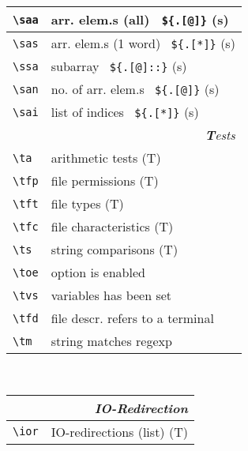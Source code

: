\documentclass[oneside,11pt,landscape,DIV16]{scrartcl}
\begin{document}
\begin{multicols}{3}
\begin{center}
\begin{tabular}[]{|p{11mm}|p{60mm}|}
\hline \verb'\saa' & arr. elem.s (all) \ \verb'${.[@]}'    \hfill (s)\\
\hline \verb'\sas' & arr. elem.s (1 word) \ \verb'${.[*]}' \hfill (s)\\
\hline \verb'\ssa' & subarray \ \verb'${.[@]::}'           \hfill (s)\\
\hline \verb'\san' & no. of arr. elem.s \ \verb'${.[@]}'   \hfill (s)\\
\hline \verb'\sai' & list of indices \ \verb'${.[*]}'      \hfill (s)\\
\hline
\hline
\multicolumn{2}{|r|}{\textsl{\textbf{T}ests}}                 \\[1.0ex]
\hline \verb'\ta'  & arithmetic tests                  \hfill (T)\\
\hline \verb'\tfp' & file permissions                  \hfill (T)\\
\hline \verb'\tft' & file types                        \hfill (T)\\
\hline \verb'\tfc' & file characteristics              \hfill (T)\\
\hline \verb'\ts'  & string comparisons                \hfill (T)\\
\hline \verb'\toe' & option is enabled                 \\
\hline \verb'\tvs' & variables has been set            \\
\hline \verb'\tfd' & file descr.  refers to a terminal \\
\hline \verb'\tm'  & string matches regexp             \\
\hline
\end{tabular}\\
%
\begin{tabular}[]{|p{11mm}|p{60mm}|}
\hline
\multicolumn{2}{|r|}{\textsl{\textbf{I}O-Redirection}}                 \\[1.0ex]
\hline \verb'\ior'   & IO-redirections (list)           \hfill (T)\\

\end{tabular}
\end{center}
\end{multicols}
\end{document}
